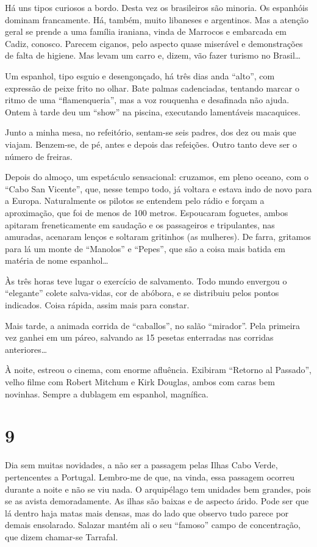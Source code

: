 Há uns tipos curiosos a bordo. Desta vez os brasileiros são minoria. Os espanhóis dominam francamente. Há, também, muito libaneses e argentinos. Mas a atenção geral se prende a uma família iraniana, vinda de Marrocos e embarcada em Cadiz, conosco. Parecem ciganos, pelo aspecto quase miserável e demonstrações de falta de higiene. Mas levam um carro e, dizem, vão fazer turismo no Brasil\ldots

Um espanhol, tipo esguio e desengonçado, há três dias anda “alto”, com expressão de peixe frito no olhar. Bate palmas cadenciadas, tentando marcar o ritmo de uma “flamenqueria”, mas a voz rouquenha e desafinada não ajuda. Ontem à tarde deu um “show” na piscina, executando lamentáveis macaquices.

Junto a minha mesa, no refeitório, sentam-se seis padres, dos dez ou mais que viajam. Benzem-se, de pé, antes e depois das refeições. Outro tanto deve ser o número de freiras.

Depois do almoço, um espetáculo sensacional: cruzamos, em pleno oceano, com o “Cabo San Vicente”, que, nesse tempo todo, já voltara e estava indo de novo para a Europa. Naturalmente os pilotos se entendem pelo rádio e forçam a aproximação, que foi de menos de 100 metros. Espoucaram foguetes, ambos apitaram freneticamente em saudação e os passageiros e tripulantes, nas amuradas, acenaram lenços e soltaram gritinhos (as mulheres). De farra, gritamos para lá um monte de “Manolos” e “Pepes”, que são a coisa mais batida em matéria de nome espanhol\ldots

Às três horas teve lugar o exercício de salvamento. Todo mundo envergou o “elegante” colete salva-vidas, cor de abóbora, e se distribuiu pelos pontos indicados. Coisa rápida, assim mais para constar.

Mais tarde, a animada corrida de “caballos”, no salão “mirador”. Pela primeira vez ganhei em um páreo, salvando as 15 pesetas enterradas nas corridas anteriores\ldots

À noite, estreou o cinema, com enorme afluência. Exibiram “Retorno al Passado”, velho filme com Robert Mitchum e Kirk Douglas, ambos com caras bem novinhas. Sempre a dublagem em espanhol, magnífica.

\section*{9 \adfflatleafright {}}
Dia sem muitas novidades, a não ser a passagem pelas Ilhas Cabo Verde, pertencentes a Portugal. Lembro-me de que, na vinda, essa passagem ocorreu durante a noite e não se viu nada. O arquipélago tem unidades bem grandes, pois se as avista demoradamente. As ilhas são baixas e de aspecto árido. Pode ser que lá dentro haja matas mais densas, mas do lado que observo tudo parece por demais ensolarado. Salazar mantém ali o seu “famoso” campo de concentração, que dizem chamar-se Tarrafal.

